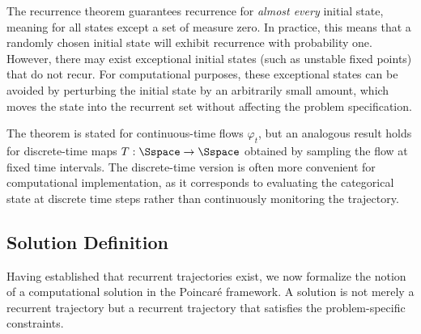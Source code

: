 \begin{remark}
\label{rem:almost_every}
The recurrence theorem guarantees recurrence for \textit{almost every} initial state, meaning for all states except a set of measure zero. In practice, this means that a randomly chosen initial state will exhibit recurrence with probability one. However, there may exist exceptional initial states (such as unstable fixed points) that do not recur. For computational purposes, these exceptional states can be avoided by perturbing the initial state by an arbitrarily small amount, which moves the state into the recurrent set without affecting the problem specification.
\end{remark}

\begin{remark}
\label{rem:continuous_discrete}
The theorem is stated for continuous-time flows $\varphi_t$, but an analogous result holds for discrete-time maps $T: \Sspace \to \Sspace$ obtained by sampling the flow at fixed time intervals. The discrete-time version is often more convenient for computational implementation, as it corresponds to evaluating the categorical state at discrete time steps rather than continuously monitoring the trajectory.
\end{remark}

\subsection{Solution Definition}

Having established that recurrent trajectories exist, we now formalize the notion of a computational solution in the Poincaré framework. A solution is not merely a recurrent trajectory but a recurrent trajectory that satisfies the problem-specific constraints.

